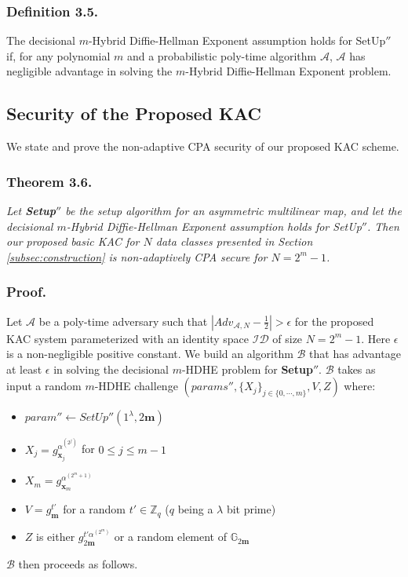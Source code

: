 \subsubsection{Definition 3.5.} The decisional $m$-Hybrid Diffie-Hellman Exponent assumption holds for {SetUp}$''$ if, for any polynomial $m$ and a probabilistic poly-time algorithm $\mathcal{A}$, $\mathcal{A}$ has negligible advantage in solving the $m$-Hybrid Diffie-Hellman Exponent problem.

\subsection{Security of the Proposed KAC}
\label{subsec:security1}

We state and prove the non-adaptive CPA security of our proposed KAC scheme.

\subsubsection{Theorem 3.6.} \textit{Let \textbf{Setup}$''$ be the setup algorithm for an asymmetric multilinear map, and let the decisional $m$-Hybrid Diffie-Hellman Exponent assumption holds for {SetUp}$''$. Then our proposed basic KAC for $N$ data classes presented in Section \ref{subsec:construction} is non-adaptively CPA secure for $N=2^m-1$.}

\subsubsection{Proof.} Let $\mathcal{A}$ be a poly-time adversary such that $|Adv_{\mathcal{A},N}-\frac{1}{2}| > \epsilon$ for the proposed KAC system parameterized with an identity space $\mathcal{ID}$ of size $N=2^m-1$. Here $\epsilon$ is a non-negligible positive constant. We build an algorithm $\mathcal{B}$ that has advantage at least $\epsilon$ in solving the decisional $m$-HDHE problem for \textbf{Setup}$''$. $\mathcal{B}$ takes as input a random $m$-HDHE challenge $(params'',\{X_j\}_{j\in\{0,\cdots,m\}},V,Z)$ where:
\begin{itemize}
 \item $param''\leftarrow SetUp''(1^{\lambda},2\mathbf{m})$
 \item $X_j=g^{\alpha^{(2^j)}}_{\mathbf{x}_j}$ for $0\leq j \leq m-1$
 \item $X_m=g^{\alpha^{(2^m+1)}}_{\mathbf{x}_m}$
 \item $V=g^{t'}_{\mathbf{m}}$ for a random $t'\in\mathbb{Z}_q$ ($q$ being a $\lambda$ bit prime)
 \item $Z$ is either $g^{t'\alpha^{(2^m)}}_{2\mathbf{m}}$ or a random element of $\mathbb{G}_{2\mathbf{m}}$
\end{itemize}
\noindent $\mathcal{B}$ then proceeds as follows.\\

